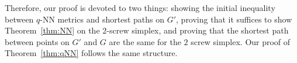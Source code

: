 Therefore, our proof is devoted to two things: showing the initial
inequality between $q$-NN metrics and shortest paths on $G'$, proving
that it suffices to show Theorem~\ref{thm:NN} on the $2$-screw simplex, and
proving that the shortest path between points on $G'$ and $G$ are the same
for the $2$ screw simplex. Our proof of Theorem~\ref{thm:qNN} follows the
same structure.


